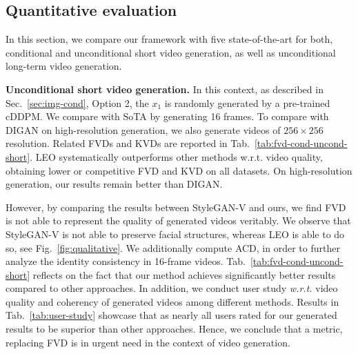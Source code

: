 {\begin{table}[!t]
\begin{center}
\setlength\arrayrulewidth{0.8pt}
\end{center}
\caption{\textbf{Evaluation for unconditional long-term video generation.} LEO outperforms other methods on long-term (128 frames) video generation w.r.t. FVD, KVD and ACD.}
\label{tab:fvd-uncond-long}
\end{table}

\subsection{Quantitative evaluation}
In this section, we compare our framework with five state-of-the-art for both, conditional and unconditional short video generation, as well as unconditional long-term video generation.

\textbf{Unconditional short video generation.} In this context, as described in Sec.~\ref{sec:img-cond}, Option 2, the $x_1$ is randomly generated by a pre-trained cDDPM. We compare with SoTA by generating 16 frames. To compare with DIGAN on high-resolution generation, we also generate videos of $256\times 256$ resolution. Related FVDs and KVDs are reported in Tab.~\ref{tab:fvd-cond-uncond-short}. LEO systematically outperforms other methods w.r.t. video quality, obtaining lower or competitive FVD and KVD on all datasets. On high-resolution generation, our results remain better than DIGAN. 

However, by comparing the results between StyleGAN-V and ours, we find FVD is not able to represent the quality of generated videos veritably. We observe that StyleGAN-V is not able to preserve facial structures, whereas LEO is able to do so, see Fig.~\ref{fig:qualitative}. We additionally compute ACD, in order to further analyze the identity consistency in 16-frame videos. Tab.~\ref{tab:fvd-cond-uncond-short} reflects on the fact that our method achieves significantly better results compared to other approaches. In addition, we conduct user study \textit{w.r.t.} video quality and coherency of generated videos among different methods. Results in Tab.~{\ref{tab:user-study}} showcase that as nearly all users rated for our generated results to be superior than other approaches. Hence, we conclude that a metric, replacing FVD is in urgent need in the context of video generation.

}
